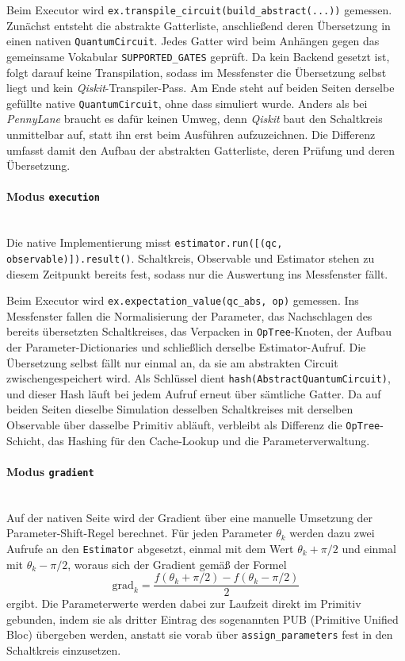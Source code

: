 Beim Executor wird \verb|ex.transpile_circuit(build_abstract(...))| gemessen.
Zunächst entsteht die abstrakte Gatterliste, anschließend deren Übersetzung in einen
nativen \verb|QuantumCircuit|. Jedes Gatter wird beim Anhängen gegen das gemeinsame
Vokabular \verb|SUPPORTED_GATES| geprüft. Da kein Backend gesetzt ist, folgt darauf
keine Transpilation, sodass im Messfenster die Übersetzung selbst liegt und kein
\textit{Qiskit}-Transpiler-Pass. Am Ende steht auf beiden Seiten derselbe gefüllte
native \verb|QuantumCircuit|, ohne dass simuliert wurde. Anders als bei
\textit{PennyLane} braucht es dafür keinen Umweg, denn \textit{Qiskit} baut den
Schaltkreis unmittelbar auf, statt ihn erst beim Ausführen aufzuzeichnen. Die
Differenz umfasst damit den Aufbau der abstrakten Gatterliste, deren Prüfung und
deren Übersetzung.

\paragraph*{Modus \texttt{execution}}\mbox{}\\
Die native Implementierung misst \verb|estimator.run([(qc, observable)]).result()|. Schaltkreis,
Observable und Estimator stehen zu diesem Zeitpunkt bereits fest, sodass nur die
Auswertung ins Messfenster fällt.

Beim Executor wird \verb|ex.expectation_value(qc_abs, op)| gemessen. Ins Messfenster
fallen die Normalisierung der Parameter, das Nachschlagen des bereits übersetzten
Schaltkreises, das Verpacken in \texttt{OpTree}-Knoten, der Aufbau der
Parameter-Dictionaries und schließlich derselbe Estimator-Aufruf. Die Übersetzung
selbst fällt nur einmal an, da sie am abstrakten Circuit zwischengespeichert wird.
Als Schlüssel dient \verb|hash(AbstractQuantumCircuit)|, und dieser Hash läuft bei
jedem Aufruf erneut über sämtliche Gatter. Da auf beiden Seiten dieselbe Simulation
desselben Schaltkreises mit derselben Observable über dasselbe Primitiv abläuft,
verbleibt als Differenz die \texttt{OpTree}-Schicht, das Hashing für den Cache-Lookup
und die Parameterverwaltung.

\paragraph*{Modus \texttt{gradient}}\mbox{}\\
Auf der nativen Seite wird der Gradient über eine manuelle Umsetzung der Parameter-Shift-Regel berechnet. Für jeden Parameter $\theta_k$ werden dazu zwei Aufrufe an den \texttt{Estimator} abgesetzt, einmal mit dem Wert $\theta_k + \pi/2$ und einmal mit $\theta_k - \pi/2$, woraus sich der Gradient gemäß der Formel
\[
  \mathrm{grad}_k = \frac{f(\theta_k + \pi/2) - f(\theta_k - \pi/2)}{2}
\]
ergibt. Die Parameterwerte werden dabei zur Laufzeit direkt im Primitiv gebunden, indem sie als dritter Eintrag des sogenannten PUB (Primitive Unified Bloc) übergeben werden, anstatt sie vorab über \verb|assign_parameters| fest in den Schaltkreis einzusetzen.

